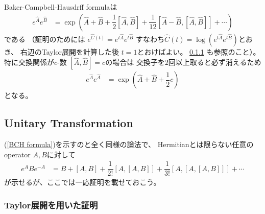 Baker-Campbell-Hausdrff formulaは
\begin{align}
    e^{\hat{A}} e^{\hat{B}}
    &=
    \exp\left(
        \hat{A} + \hat{B}
        + \dfrac{1}{2}[\hat{A},\hat{B}]
        + \dfrac{1}{12}[\hat{A} - \hat{B},[\hat{A},\hat{B}]]
        + \cdots
    \right)
\label{BCH formula}
\end{align}
である
（証明のためには
$e^{\hat{C}(t)}
= e^{t\hat{A}} e^{t\hat{B}}$
すなわち$\hat{C}(t) = \log (
    e^{t\hat{A}} e^{t\hat{B}}
)$とおき、
右辺のTaylor展開を計算した後
$t=1$とおけばよい。
\ref{proof for unitary transf formula for operator}
も参照のこと）。
特に交換関係が$c$-数
$[\hat{A},\hat{B}]=c$の場合は
交換子を$2$回以上取ると必ず消えるため
\begin{align}
    e^{\hat{A}} e^{\hat{A}}
    &=
    \exp\left(
        \hat{A} + \hat{B}
        + \dfrac{1}{2}c
    \right)
\label{simpler BCH formula}    
\end{align}
となる。

\newpage
\subsection{Unitary Transformation}

(\ref{BCH formula})を示すのと全く同様の論法で、
Hermitianとは限らない任意のoperator $A, B$に対して
\begin{align}
    e^A B e^{-A}
    &=
    B + [A,B] + \dfrac{1}{2!}[A,[A,B]]
    +
    \dfrac{1}{3!}[A,[A,[A,B]]]
    +
    \cdots
\label{unitary transf formula for operator}
\end{align}
が示せるが、ここでは一応証明を載せておこう。

\subsubsection{Taylor展開を用いた証明}
\label{proof for unitary transf formula for operator}

